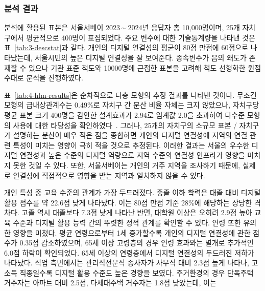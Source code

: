 \subsubsection{분석 결과}
\label{subsubsec:3-2-2}

분석에 활용된 표본은 서울서베이 2023\,$\sim$\,2024년 응답자 총 10,000명이며, 25개 자치구에서 평균적으로 400명이 표집되었다. 주요 변수에 대한 기술통계량을 나타낸 것은 표~\ref{tab:3-descstat}과 같다. 개인의 디지털 연결성의 평균이 80점 만점에 60점으로 나타났는데, 서울시민의 높은 디지털 연결성을 잘 보여준다. 종속변수가 음의 왜도가 존재할 수 있으나 기관 표준 척도와 10000명에 근접한 표본을 고려해 척도 선형화한 원점수대로 분석을 진행하였다.

표~\ref{tab:4-hlm-results}은 순차적으로 다층 모형의 추정 결과를 나타낸 것이다. 무조건 모형의 급내상관계수는 0.49\%로 자치구 간 분산 비율 자체는 크지 않았으나, 자치구당 평균 표본 크기 400명을 감안한 설계효과가 2.94로 임계값 2.0을 초과하여 다수준 모형의 사용에 대한 타당성을 확인하였다~\citep{HoxEtAl2018}. 그러나, 25개의 자치구의 소규모 표본 / 자치구가 설명하는 분산이 매우 적은 점을 종합하면 개인의 디지털 연결성에 지역의 연결 관련 특성이 미치는 영향이 극히 적을 것으로 추정된다. 이러한 결과는 서울의 우수한 디지털 연결성과 높은 수준의 디지털 역량으로 지역 수준의 연결성 인프라가 영향을 미치지 못한 것일 수 있다. 또한, 서울서베이는 개인의 거주 지역을 조사하기 때문에, 실제로 연결성에 직접적으로 영향을 받는 지역과 일치하지 않을 수 있다.

개인 특성 중 교육 수준의 관계가 가장 두드러졌다. 중졸 이하 학력은 대졸 대비 디지털 활용 점수를 약 22.6점 낮게 나타났다. 이는 80점 만점 기준 28\%에 해당하는 상당한 격차다. 고졸 역시 대졸보다 7.3점 낮게 나타난 반면, 대학원 이상은 오히려 2.9점 높아 교육 수준과 디지털 활용 능력 간의 뚜렷한 정적 관계를 확인할 수 있다. 연령 또한 유의한 영향을 미쳤다. 평균 연령으로부터 1세 증가할수록 개인의 디지털 연결성에 관한 점수가 0.35점 감소하였으며, 65세 이상 고령층의 경우 연령 효과와는 별개로 추가적인 6.0점 하락이 확인되었다. 65세 이상의 연령층에서 디지털 연결성의 두드러진 저하가 나타났다. 직업 측면에서는 관리직\textperiodcentered{}전문직 종사자가 사무직 대비 2.3점 높게 나타나, 고소득 직종일수록 디지털 활용 수준도 높은 경향을 보였다. 주거환경의 경우 단독주택 거주자는 아파트 대비 2.5점, 다세대주택 거주자는 1.8점 낮았는데, 이는

